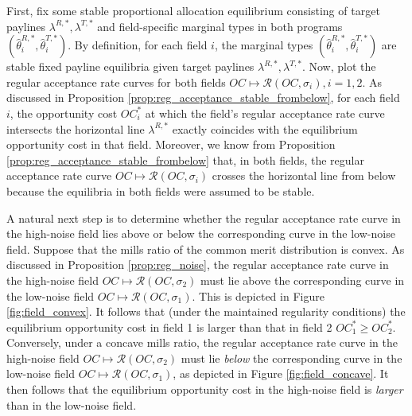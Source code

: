 \documentclass[12pt,reqno]{amsart}
\theoremstyle{definition}
\theoremstyle{plain} %
\begin{document}
\noindent First, fix some stable proportional allocation equilibrium consisting of target paylines $\lambda^{R,*},\lambda^{T,*}$ and field-specific marginal types in both programs $(\hat{\theta}^{R,*}_i,\hat{\theta}^{T,*}_i)$. By definition, for each field $i$, the marginal types $(\hat{\theta}^{R,*}_i,\hat{\theta}^{T,*}_i)$ are stable fixed payline equilibria given target paylines $\lambda^{R,*},\lambda^{T,*}$. Now, plot the regular acceptance rate curves for both fields $OC\mapsto \mathcal{R}(OC,\sigma_i), i=1,2$. As discussed in Proposition \ref{prop:reg_acceptance_stable_frombelow}, for each field $i$, the opportunity cost $OC_i^*$ at which the field's regular acceptance rate curve intersects the horizontal line $\lambda^{R,*}$ exactly coincides with the equilibrium opportunity cost in that field. Moreover, we know from Proposition \ref{prop:reg_acceptance_stable_frombelow} that, in both fields, the regular acceptance rate curve $OC\mapsto \mathcal{R}(OC,\sigma_i)$ crosses the horizontal line from below because the equilibria in both fields were assumed to be stable. 

\noindent A natural next step is to determine whether the regular acceptance rate curve in the high-noise field lies above or below the corresponding curve in the low-noise field. Suppose that the mills ratio of the common merit distribution is convex. As discussed in Proposition \ref{prop:reg_noise}, the regular acceptance rate curve in the high-noise field $OC\mapsto \mathcal{R}(OC,\sigma_2)$ must lie above the corresponding curve in the low-noise field $OC\mapsto \mathcal{R}(OC,\sigma_1)$. This is depicted in Figure \ref{fig:field_convex}. It follows that (under the maintained regularity conditions) the equilibrium opportunity cost in field 1 is larger than that in field 2 $OC_1^*\geq OC_2^*$. Conversely, under a concave mills ratio, the regular acceptance rate curve in the high-noise field $OC\mapsto \mathcal{R}(OC,\sigma_2)$ must lie \textit{below} the corresponding curve in the low-noise field $OC\mapsto \mathcal{R}(OC,\sigma_1)$, as depicted in Figure \ref{fig:field_concave}. It then follows that the equilibrium opportunity cost in the high-noise field is \textit{larger} than in the low-noise field. 


\end{document}

